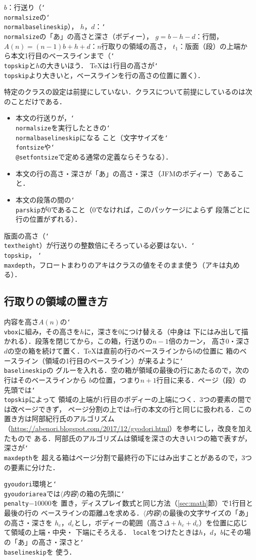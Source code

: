 \documentclass[paper=a4,dvipdfmx]{jlreq}
\newcommand\opt[1]{\texttt{#1}}
\newcommand\env[1]{\texttt{#1}}
\newcommand\cs[1]{\texttt{\char`\\#1}}
\newcommand\meta[1]{$\langle$\textit{#1}$\rangle$}
\begin{document}
$b$：行送り（\cs{normalsize}の\cs{normalbaselineskip}），
$h$，$d$：\cs{normalsize}の「あ」の高さと深さ（ボディー），
$g=b-h-d$：行間，
$A(n)=(n-1)b+h+d$：$n$行取りの領域の高さ，
$t_1$：版面（段）の上端から本文1行目のベースラインまで（\cs{topskip}と$h$の大きいほう．
\TeX{}は1行目の高さが\cs{topskip}より大きいと，ベースラインを行の高さの位置に置く）．

特定のクラスの設定は前提にしていない．クラスについて前提にしているのは次のことだけである．
\begin{itemize}
\item 本文の行送りが，\cs{normalsize}を実行したときの\cs{normalbaselineskip}になる
  こと（文字サイズを\cs{fontsize}や\cs{@setfontsize}で定める通常の定義ならそうなる）．
\item 本文の行の高さ・深さが「あ」の高さ・深さ（JFMのボディー）であること．
\item 本文の段落の間の\cs{parskip}が0であること（0でなければ，このパッケージによらず
  段落ごとに行の位置がずれる）．
\end{itemize}
版面の高さ（\cs{textheight}）が行送りの整数倍にそろっている必要はない．\cs{topskip}，
\cs{maxdepth}，フロートまわりのアキはクラスの値をそのまま使う（アキは丸める）．

\subsection{行取りの領域の置き方}
\label{sec:place}

内容を高さ$A(n)$の\cs{vbox}に組み，その高さを$h$に，深さを0につけ替える（中身は
下にはみ出して描かれる）．段落を閉じてから，この箱，行送りの$n-1$倍のカーン，
高さ0・深さ$d$の空の箱を続けて置く．\TeX{}は直前の行のベースラインから$b$の位置に
箱のベースライン（領域の1行目のベースライン）が来るように\cs{baselineskip}の
グルーを入れる．空の箱が領域の最後の行にあたるので，次の行はそのベースラインから
$b$の位置，つまり$n+1$行目に来る．ページ（段）の先頭では\cs{topskip}によって
領域の上端が1行目のボディーの上端につく．3つの要素の間では改ページできず，
ページ分割の上では$n$行の本文の行と同じに扱われる．この置き方は阿部紀行氏のアルゴリズム
（\url{https://abenori.blogspot.com/2017/12/gyodori.html}）を参考にし，改良を加えたもので
ある．阿部氏のアルゴリズムは領域を深さの大きい1つの箱で表すが，深さが\cs{maxdepth}を
超える箱はページ分割で最終行の下にはみ出すことがあるので，3つの要素に分けた．

\env{gyoudori}環境と\cs{gyoudoriarea}では\meta{内容}の箱の先頭に\cs{penalty}$-10000$を
置き，ディスプレイ数式と同じ方法（\ref{sec:math}\nobreak 節）で1行目と最後の行の
ベースラインの距離$\Delta$を求める．\meta{内容}の最後の文字サイズの「あ」の高さ・深さを
$h_c$，$d_c$とし，ボディーの範囲（高さ$\Delta+h_c+d_c$）を位置に応じて領域の上端・中央・
下端にそろえる．
\opt{local}をつけたときは$h$，$d$，$b$にその場の「あ」の高さ・深さと\cs{baselineskip}を
使う．
\end{document}
